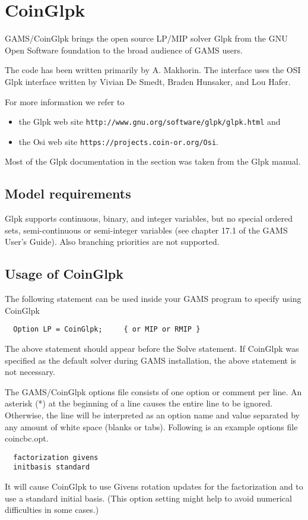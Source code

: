 \section{CoinGlpk}

GAMS/CoinGlpk brings the open source LP/MIP solver Glpk from the GNU Open Software foundation to the broad audience of GAMS users.

The code has been written primarily by A. Makhorin.
The interface uses the OSI Glpk interface written by Vivian De Smedt, Braden Hunsaker, and Lou Hafer.

For more information we refer to
\begin{itemize}
\item the Glpk web site \texttt{http://www.gnu.org/software/glpk/glpk.html} and
\item the Osi web site \texttt{https://projects.coin-or.org/Osi}.
\end{itemize}
Most of the Glpk documentation in the section was taken from the Glpk manual.

\subsection{Model requirements}

Glpk supports continuous, binary, and integer variables, but no special ordered sets, semi-continuous or semi-integer variables (see chapter 17.1 of the GAMS User's Guide).
Also branching priorities are not supported.

\subsection{Usage of CoinGlpk}

The following statement can be used inside your GAMS program to specify using CoinGlpk
\begin{verbatim}
  Option LP = CoinGlpk;     { or MIP or RMIP }
\end{verbatim}

The above statement should appear before the Solve statement.
If CoinGlpk was specified as the default solver during GAMS installation, the above statement is not necessary.

The GAMS/CoinGlpk options file consists of one option or comment per line.
An asterisk (*) at the beginning of a line causes the entire line to be ignored.
Otherwise, the line will be interpreted as an option name and value separated by any amount of white space (blanks or tabs).
Following is an example options file coincbc.opt.
\begin{verbatim}
  factorization givens
  initbasis standard
\end{verbatim}
It will cause CoinGlpk to use Givens rotation updates for the factorization and to use a standard initial basis. (This option setting might help to avoid numerical difficulties in some cases.)

